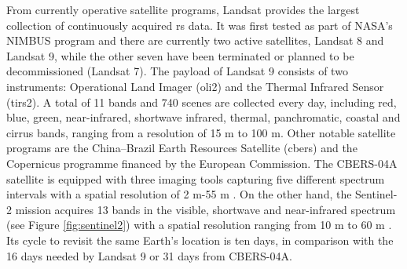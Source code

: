 From currently operative satellite programs, Landsat provides the largest collection of continuously acquired \acrshort{rs} data. It was first tested as part of NASA's NIMBUS program and there are currently two active satellites, Landsat 8 and Landsat 9, while the other seven have been terminated or planned to be decommissioned (Landsat 7). The payload of Landsat 9 consists of two instruments: Operational Land Imager (\acrshort{oli2}) and the Thermal Infrared Sensor (\acrshort{tirs2}). A total of 11 bands and 740 scenes are collected every day, including red, blue, green, near-infrared, shortwave infrared, thermal, panchromatic, coastal and cirrus bands, ranging from a resolution of 15 \si{\meter} to 100 \si{\meter}. Other notable satellite programs are the China–Brazil Earth Resources Satellite (\acrshort{cbers}) and the Copernicus programme financed by the European Commission. The CBERS-04A satellite is equipped with three imaging tools capturing five different spectrum intervals with a spatial resolution of 2 \si{\meter}-55 \si{\meter} \cite{instituto_nacional_de_pesquisas_espaciais_inpecbers_2019}. On the other hand, the Sentinel-2 mission acquires 13 bands in the visible, shortwave and near-infrared spectrum (see Figure \ref{fig:sentinel2}) with a spatial resolution ranging from 10 \si{\meter} to 60 \si{\meter} \cite{european_environment_agency_eu_2017}. Its cycle to revisit the same Earth's location is ten days, in comparison with the 16 days needed by Landsat 9 or 31 days from CBERS-04A.

